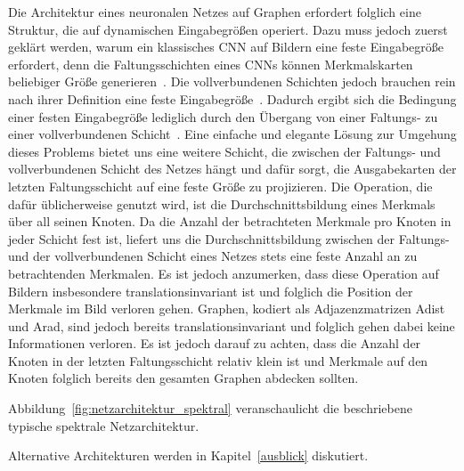 Die Architektur eines neuronalen Netzes auf Graphen erfordert folglich eine Struktur, die auf dynamischen Eingabegrößen operiert.
Dazu muss jedoch zuerst geklärt werden, warum ein klassisches \gls{CNN} auf Bildern eine feste Eingabegröße erfordert, denn die Faltungsschichten eines \glspl{CNN} können Merkmalskarten beliebiger Größe generieren~\cite{spp}.
Die vollverbundenen Schichten jedoch brauchen rein nach ihrer Definition eine feste Eingabegröße~\cite{spp}.
Dadurch ergibt sich die Bedingung einer festen Eingabegröße lediglich durch den Übergang von einer Faltungs- zu einer vollverbundenen Schicht~\cite{spp}.
Eine einfache und elegante Lösung zur Umgehung dieses Problems bietet uns eine weitere Schicht, die zwischen der Faltungs- und vollverbundenen Schicht des Netzes hängt und dafür sorgt, die Ausgabekarten der letzten Faltungsschicht auf eine feste Größe zu projizieren.
Die Operation, die dafür üblicherweise genutzt wird, ist die Durchschnittsbildung eines Merkmals über all seinen Knoten.
Da die Anzahl der betrachteten Merkmale pro Knoten in jeder Schicht fest ist, liefert uns die Durchschnittsbildung zwischen der Faltungs- und der vollverbundenen Schicht eines Netzes stets eine feste Anzahl an zu betrachtenden Merkmalen.
Es ist jedoch anzumerken, dass diese Operation auf Bildern insbesondere translationsinvariant ist und folglich die Position der Merkmale im Bild verloren gehen.
Graphen, kodiert als Adjazenzmatrizen \gls{Adist} und \gls{Arad}, sind jedoch bereits translationsinvariant und folglich gehen dabei keine Informationen verloren.
Es ist jedoch darauf zu achten, dass die Anzahl der Knoten in der letzten Faltungsschicht relativ klein ist und Merkmale auf den Knoten folglich bereits den gesamten Graphen abdecken sollten.

Abbildung~\ref{fig:netzarchitektur_spektral} veranschaulicht die beschriebene typische spektrale Netzarchitektur.

Alternative Architekturen werden in Kapitel~\ref{ausblick} diskutiert.
